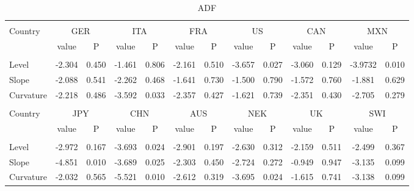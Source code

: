 \documentclass{article}
\begin{document}
\begin{table}[h]
\caption{ADF} %
\fontsize{10}{10}\selectfont
\centering%
\begin{tabular}{l cc cc cc cc cc cc}%
\hline\hline \\ [-1.5ex]                         %

Country	&	\multicolumn{2}{c}{GER}			&	\multicolumn{2}{c}{ITA}			&	\multicolumn{2}{c}{FRA}			&	\multicolumn{2}{c}{US}			&	\multicolumn{2}{c}{CAN}			&	\multicolumn{2}{c}{MXN}			\\[0.5ex] 

 & value &P & value &P& value &P & value &P& value &P & value &P\\

\hline       \\ [-1.5ex] 

Level	&	-2.304	&	0.450	&	-1.461	&	0.806	&	-2.161	&	0.510	&	-3.657	&	0.027	&	-3.060	&	0.129	&	-3.9732	&	0.010	\\
Slope	&	-2.088	&	0.541	&	-2.262	&	0.468	&	-1.641	&	0.730	&	-1.500	&	0.790	&	-1.572	&	0.760	&	-1.881	&	0.629	\\
\medskip
Curvature	&	-2.218	&	0.486	&	-3.592	&	0.033	&	-2.357	&	0.427	&	-1.621	&	0.739	&	-2.351	&	0.430	&	-2.705	&	0.279	\\

\hline\hline   \\ [-1.5ex]    

Country	&	\multicolumn{2}{c}{JPY}			&	\multicolumn{2}{c}{CHN}			&	\multicolumn{2}{c}{AUS}			&	\multicolumn{2}{c}{NEK}			&	\multicolumn{2}{c}{UK}			&	\multicolumn{2}{c}{SWI}			\\

 & value &P & value &P& value &P & value &P& value &P & value &P\\

\hline       \\ [-1.5ex] 

Level	&	-2.972	&	0.167	&	-3.693	&	0.024	&	-2.901	&	0.197	&	-2.630	&	0.312	&	-2.159	&	0.511	&	-2.499	&	0.367	\\
Slope	&	-4.851	&	0.010	&	-3.689	&	0.025	&	-2.303	&	0.450	&	-2.724	&	0.272	&	-0.949	&	0.947	&	-3.135	&	0.099	\\
Curvature	&	-2.032	&	0.565	&	-5.521	&	0.010	&	-2.612	&	0.319	&	-3.695	&	0.024	&	-1.615	&	0.741	&	-3.138	&	0.099	\\

\hline            
\end{tabular}
\label{table:nonlin}%
\end{table}
\end{document}

